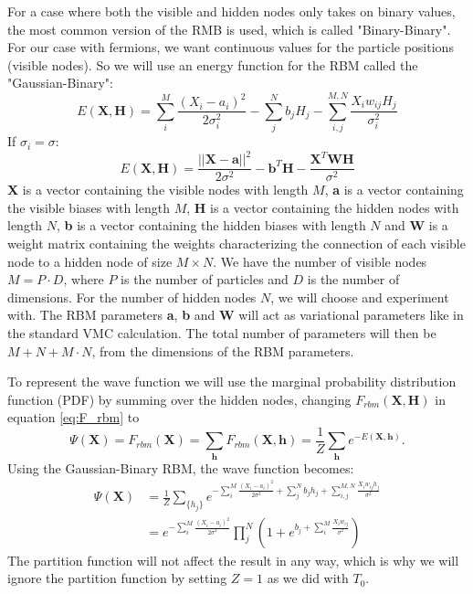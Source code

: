 \documentclass[12pt,a4paper,english]{article}
\begin{document}
For a case where both the visible and hidden nodes only takes on binary values, the most common version of the RMB is used, which is called "Binary-Binary". For our case with fermions, we want continuous values for the particle positions (visible nodes). So we will use an energy function for the RBM called the "Gaussian-Binary":
\begin{equation}
\label{eq:Gaussian_binary}
E(\textbf{X},\textbf{H})=\sum_{i}^{M}\frac{(X_i-a_i)^2}{2\sigma_i^2} - \sum_{j}^{N}b_jH_j - \sum_{i,j}^{M,N}\frac{X_iw_{ij}H_j}{\sigma_i^2}
\end{equation}
If $\sigma_i=\sigma$:
\begin{equation}
\label{eq:Gaussian_binary2}
E(\textbf{X},\textbf{H})=\frac{||\textbf{X}-\textbf{a}||^2}{2\sigma^2} - \textbf{b}^T\textbf{H} - \frac{\textbf{X}^T\textbf{W}\textbf{H}}{\sigma^2}
\end{equation}
\textbf{X} is a vector containing the visible nodes with length $M$, \textbf{a} is a vector containing the visible biases with length $M$, \textbf{H} is a vector containing the hidden nodes with length $N$, \textbf{b} is a vector containing the hidden biases with length $N$ and \textbf{W} is a weight matrix containing the weights characterizing the connection of each visible node to a hidden node of size $M\times N$. We have the number of visible nodes $M=P\cdot D$, where $P$ is the number of particles and $D$ is the number of dimensions. For the number of hidden nodes $N$, we will choose and experiment with. The RBM parameters \textbf{a}, \textbf{b} and \textbf{W} will act as variational parameters like in the standard VMC calculation. The total number of parameters will then be $M+N+M\cdot N$, from the dimensions of the RBM parameters.

To represent the wave function we will use the marginal probability distribution function (PDF) by summing over the hidden nodes, changing $F_{rbm}(\textbf{X}, \textbf{H})$ in equation \ref{eq:F_rbm} to 
\begin{equation}
\label{eq:F_rbm_marginal}
\Psi(\textbf{X})=F_{rbm}(\textbf{X})=\sum_{\textbf{h}}F_{rbm}(\textbf{X}, \textbf{h})=\frac{1}{Z}\sum_{\textbf{h}}e^{-E(\textbf{X}, \textbf{h})}.
\end{equation}
Using the Gaussian-Binary RBM, the wave function becomes:
\begin{align}
\Psi(\textbf{X})&=\frac{1}{Z}\sum_{\{h_j\}}e^{-\sum_{i}^{M}\frac{(X_i-a_i)^2}{2\sigma^2} + \sum_{j}^{N}b_jh_j + \sum_{i,j}^{M,N}\frac{X_iw_{ij}h_j}{\sigma^2}}\nonumber\\
\label{eq:wave_func}
&=e^{-\sum_{i}^{M}\frac{(X_i-a_i)^2}{2\sigma^2}}\prod_{j}^{N}\left(1+e^{b_j + \sum_{i}^{M}\frac{X_iw_{ij}}{\sigma^2}}
\right)
\end{align}
The partition function will not affect the result in any way, which is why we will ignore the partition function by setting $Z=1$ as we did with $T_0$.
\end{document}

